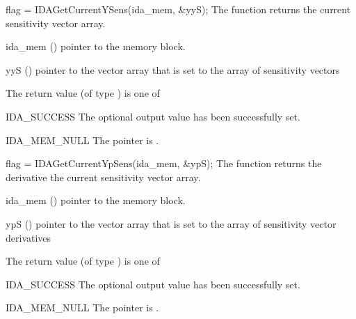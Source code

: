 {
  flag = IDAGetCurrentYSens(ida\_mem, \&yyS);
}
{
  The function  returns the current sensitivity
  vector array.
}
{
  \begin{args}
  \item[ida\_mem] ()
    pointer to the {\idas} memory block.
  \item[yyS] ()
    pointer to the vector array that is set to the array of sensitivity vectors
  \end{args}
}
{
  The return value  (of type ) is one of
  \begin{args}
  \item[IDA\_SUCCESS]
    The optional output value has been successfully set.
  \item[IDA\_MEM\_NULL]
    The  pointer is .
  \end{args}
}
{}

{
  flag = IDAGetCurrentYpSens(ida\_mem, \&ypS);
}
{
  The function  returns the derivative the current
  sensitivity vector array.
}
{
  \begin{args}
  \item[ida\_mem] ()
    pointer to the {\idas} memory block.
  \item[ypS] ()
    pointer to the vector array that is set to the array of sensitivity
    vector derivatives
  \end{args}
}
{
  The return value  (of type ) is one of
  \begin{args}
  \item[IDA\_SUCCESS]
    The optional output value has been successfully set.
  \item[IDA\_MEM\_NULL]
    The  pointer is .
  \end{args}
}
{}

